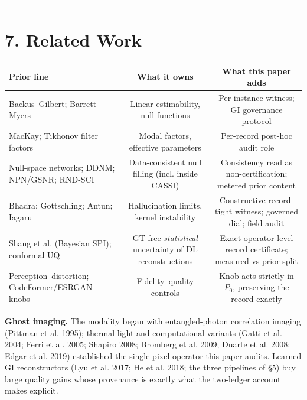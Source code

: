\documentclass[11pt]{article}
\begin{document}
\medskip\hrule\medskip

\section*{7. Related Work}

\begin{center}\begin{tabular}{lcc}
\toprule
Prior line & What it owns & What this paper adds \\
\midrule
Backus--Gilbert; Barrett--Myers & Linear estimability, null functions & Per-instance witness; GI governance protocol \\
MacKay; Tikhonov filter factors & Modal factors, effective parameters & Per-record post-hoc audit role \\
Null-space networks; DDNM; NPN/GSNR; RND-SCI & Data-consistent null filling (incl. inside CASSI) & Consistency read as non-certification; metered prior content \\
Bhadra; Gottschling; Antun; Iagaru & Hallucination limits, kernel instability & Constructive record-tight witness; governed dial; field audit \\
Shang et al. (Bayesian SPI); conformal UQ & GT-free \textit{statistical} uncertainty of DL reconstructions & Exact operator-level record certificate; measured-vs-prior split \\
Perception--distortion; CodeFormer/ESRGAN knobs & Fidelity--quality controls & Knob acts strictly in $P_0$, preserving the record exactly \\
\bottomrule
\end{tabular}\end{center}

\textbf{Ghost imaging.} The modality began with entangled-photon correlation imaging (Pittman et al. 1995); thermal-light and computational variants (Gatti et al. 2004; Ferri et al. 2005; Shapiro 2008; Bromberg et al. 2009; Duarte et al. 2008; Edgar et al. 2019) established the single-pixel operator this paper audits. Learned GI reconstructors (Lyu et al. 2017; He et al. 2018; the three pipelines of §5) buy large quality gains whose provenance is exactly what the two-ledger account makes explicit.
\end{document}
